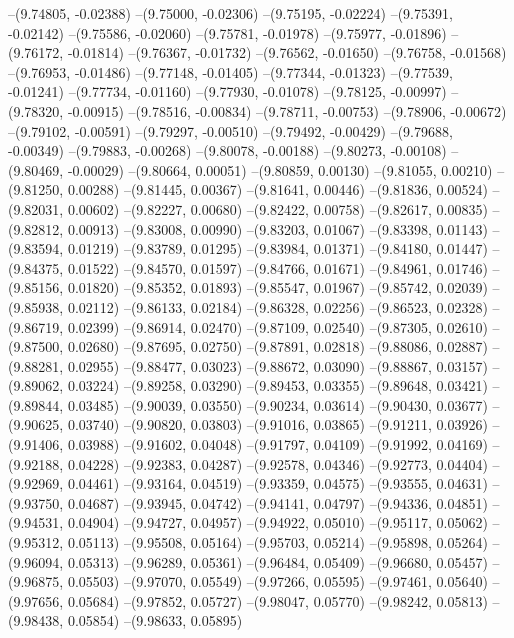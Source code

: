 --(9.74805, -0.02388)
--(9.75000, -0.02306)
--(9.75195, -0.02224)
--(9.75391, -0.02142)
--(9.75586, -0.02060)
--(9.75781, -0.01978)
--(9.75977, -0.01896)
--(9.76172, -0.01814)
--(9.76367, -0.01732)
--(9.76562, -0.01650)
--(9.76758, -0.01568)
--(9.76953, -0.01486)
--(9.77148, -0.01405)
--(9.77344, -0.01323)
--(9.77539, -0.01241)
--(9.77734, -0.01160)
--(9.77930, -0.01078)
--(9.78125, -0.00997)
--(9.78320, -0.00915)
--(9.78516, -0.00834)
--(9.78711, -0.00753)
--(9.78906, -0.00672)
--(9.79102, -0.00591)
--(9.79297, -0.00510)
--(9.79492, -0.00429)
--(9.79688, -0.00349)
--(9.79883, -0.00268)
--(9.80078, -0.00188)
--(9.80273, -0.00108)
--(9.80469, -0.00029)
--(9.80664, 0.00051)
--(9.80859, 0.00130)
--(9.81055, 0.00210)
--(9.81250, 0.00288)
--(9.81445, 0.00367)
--(9.81641, 0.00446)
--(9.81836, 0.00524)
--(9.82031, 0.00602)
--(9.82227, 0.00680)
--(9.82422, 0.00758)
--(9.82617, 0.00835)
--(9.82812, 0.00913)
--(9.83008, 0.00990)
--(9.83203, 0.01067)
--(9.83398, 0.01143)
--(9.83594, 0.01219)
--(9.83789, 0.01295)
--(9.83984, 0.01371)
--(9.84180, 0.01447)
--(9.84375, 0.01522)
--(9.84570, 0.01597)
--(9.84766, 0.01671)
--(9.84961, 0.01746)
--(9.85156, 0.01820)
--(9.85352, 0.01893)
--(9.85547, 0.01967)
--(9.85742, 0.02039)
--(9.85938, 0.02112)
--(9.86133, 0.02184)
--(9.86328, 0.02256)
--(9.86523, 0.02328)
--(9.86719, 0.02399)
--(9.86914, 0.02470)
--(9.87109, 0.02540)
--(9.87305, 0.02610)
--(9.87500, 0.02680)
--(9.87695, 0.02750)
--(9.87891, 0.02818)
--(9.88086, 0.02887)
--(9.88281, 0.02955)
--(9.88477, 0.03023)
--(9.88672, 0.03090)
--(9.88867, 0.03157)
--(9.89062, 0.03224)
--(9.89258, 0.03290)
--(9.89453, 0.03355)
--(9.89648, 0.03421)
--(9.89844, 0.03485)
--(9.90039, 0.03550)
--(9.90234, 0.03614)
--(9.90430, 0.03677)
--(9.90625, 0.03740)
--(9.90820, 0.03803)
--(9.91016, 0.03865)
--(9.91211, 0.03926)
--(9.91406, 0.03988)
--(9.91602, 0.04048)
--(9.91797, 0.04109)
--(9.91992, 0.04169)
--(9.92188, 0.04228)
--(9.92383, 0.04287)
--(9.92578, 0.04346)
--(9.92773, 0.04404)
--(9.92969, 0.04461)
--(9.93164, 0.04519)
--(9.93359, 0.04575)
--(9.93555, 0.04631)
--(9.93750, 0.04687)
--(9.93945, 0.04742)
--(9.94141, 0.04797)
--(9.94336, 0.04851)
--(9.94531, 0.04904)
--(9.94727, 0.04957)
--(9.94922, 0.05010)
--(9.95117, 0.05062)
--(9.95312, 0.05113)
--(9.95508, 0.05164)
--(9.95703, 0.05214)
--(9.95898, 0.05264)
--(9.96094, 0.05313)
--(9.96289, 0.05361)
--(9.96484, 0.05409)
--(9.96680, 0.05457)
--(9.96875, 0.05503)
--(9.97070, 0.05549)
--(9.97266, 0.05595)
--(9.97461, 0.05640)
--(9.97656, 0.05684)
--(9.97852, 0.05727)
--(9.98047, 0.05770)
--(9.98242, 0.05813)
--(9.98438, 0.05854)
--(9.98633, 0.05895)
